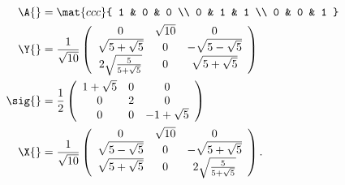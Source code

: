 \begin{equation}
  \begin{split}
    \A{} &= \mat{ccc}
    {
 1 & 0 & 0 \\
 0 & 1 & 1 \\
 0 & 0 & 1
    }\\
    \Y{}&= \frac{1}{\sqrt{10}}
    \left(
\begin{array}{ccc}
 0 & \sqrt{10} & 0 \\
 \sqrt{5+\sqrt{5}} & 0 & -\sqrt{5-\sqrt{5}} \\
 2 \sqrt{\frac{5}{5+\sqrt{5}}} & 0 & \sqrt{5+\sqrt{5}}
\end{array}
\right)\\
    \sig{}&=\frac{1}{2}
    \left(
\begin{array}{ccc}
 1+\sqrt{5} & 0 & 0 \\
 0 & 2 & 0 \\
 0 & 0 & -1+\sqrt{5}
\end{array}
\right)\\
    \X{}&=\frac{1}{\sqrt{10}}
\left(
\begin{array}{ccc}
 0 & \sqrt{10} & 0 \\
 \sqrt{5-\sqrt{5}} & 0 & -\sqrt{5+\sqrt{5}} \\
 \sqrt{5+\sqrt{5}} & 0 & 2 \sqrt{\frac{5}{5+\sqrt{5}}}
\end{array}
\right).
  \end{split}
\end{equation}
\break
\clearpage
